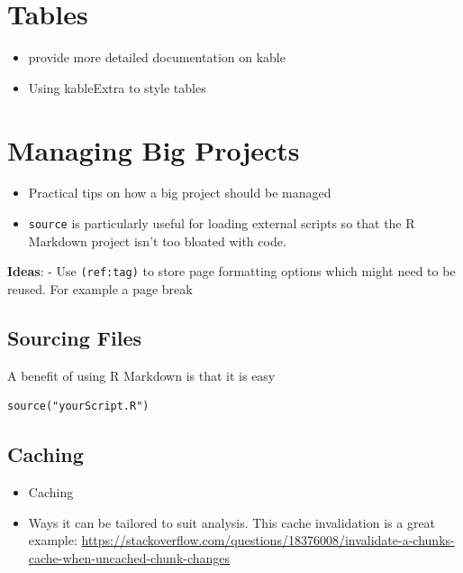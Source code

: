 \documentclass[]{book}
\providecommand{\tightlist}{%
  \setlength{\itemsep}{0pt}\setlength{\parskip}{0pt}}
\theoremstyle{definition}
\theoremstyle{definition}
\theoremstyle{definition}
\theoremstyle{remark}
\begin{document}
\hypertarget{tables}{%
\chapter{Tables}\label{tables}}

\begin{itemize}
\tightlist
\item
  provide more detailed documentation on kable
\item
  Using kableExtra to style tables
\end{itemize}

\hypertarget{managing-big-projects}{%
\chapter{Managing Big Projects}\label{managing-big-projects}}

\begin{itemize}
\tightlist
\item
  Practical tips on how a big project should be managed
\item
  \texttt{source} is particularly useful for loading external scripts so
  that the R Markdown project isn't too bloated with code.
\end{itemize}

\textbf{Ideas}: - Use \texttt{(ref:tag)} to store page formatting
options which might need to be reused. For example a page break

\hypertarget{sourcing-files}{%
\section{Sourcing Files}\label{sourcing-files}}

A benefit of using R Markdown is that it is easy

\begin{verbatim}
source("yourScript.R")
\end{verbatim}

\hypertarget{caching}{%
\section{Caching}\label{caching}}

\begin{itemize}
\tightlist
\item
  Caching
\item
  Ways it can be tailored to suit analysis. This cache invalidation is a
  great example:
  \url{https://stackoverflow.com/questions/18376008/invalidate-a-chunks-cache-when-uncached-chunk-changes}
\end{itemize}
\end{document}
